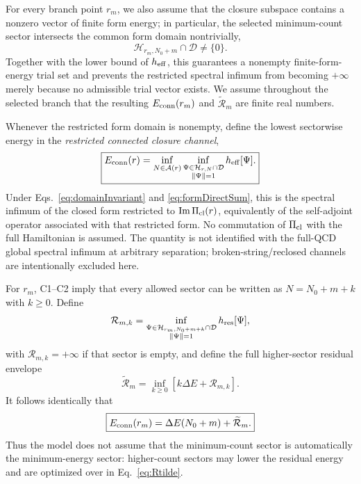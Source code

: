 \documentclass[10pt]{article}
\begin{document}
For every branch point $r_m$, we also assume that the closure subspace contains a nonzero vector of finite form energy; in particular, the selected minimum-count sector intersects the common form domain nontrivially,
\begin{equation}
\boxed{\mathcal H_{r_m,N_0+m}\cap\mathcal D\neq\{0\}.}
\label{eq:nonemptyFormSector}
\end{equation}
Together with the lower bound of $h_{\rm eff}$, this guarantees a nonempty finite-form-energy trial set and prevents the restricted spectral infimum from becoming $+\infty$ merely because no admissible trial vector exists. We assume throughout the selected branch that the resulting $E_{\rm conn}(r_m)$ and $\widetilde{\mathcal R}_m$ are finite real numbers.

Whenever the restricted form domain is nonempty, define the lowest sectorwise energy in the \emph{restricted connected closure channel},
\begin{equation}
\boxed{
E_{\rm conn}(r)=
\inf_{N\in\mathcal A(r)}
\inf_{\substack{\Psi\in\mathcal H_{r,N}\cap\mathcal D\\
\|\Psi\|=1}}
h_{\rm eff}[\Psi].
}
\label{eq:EconnDef}
\end{equation}
Under Eqs.~\eqref{eq:domainInvariant} and \eqref{eq:formDirectSum}, this is the spectral infimum of the closed form restricted to $\operatorname{Im}\Pi_{\rm cl}(r)$, equivalently of the self-adjoint operator associated with that restricted form. No commutation of $\Pi_{\rm cl}$ with the full Hamiltonian is assumed. The quantity is not identified with the full-QCD global spectral infimum at arbitrary separation; broken-string/reclosed channels are intentionally excluded here.

For $r_m$, C1--C2 imply that every allowed sector can be written as $N=N_0+m+k$ with $k\ge0$. Define
\begin{equation}
\mathcal R_{m,k}=
\inf_{\substack{\Psi\in\mathcal H_{r_m,N_0+m+k}\cap\mathcal D\\
\|\Psi\|=1}}
h_{\rm res}[\Psi],
\label{eq:Rmk}
\end{equation}
with $\mathcal R_{m,k}=+\infty$ if that sector is empty, and define the full higher-sector residual envelope
\begin{equation}
\boxed{
\widetilde{\mathcal R}_m
=\inf_{k\ge0}
\left[k\Delta E+\mathcal R_{m,k}\right].
}
\label{eq:Rtilde}
\end{equation}
It follows identically that
\begin{equation}
\boxed{
E_{\rm conn}(r_m)
=\Delta E(N_0+m)+\widetilde{\mathcal R}_m.
}
\label{eq:EconnEnvelope}
\end{equation}
Thus the model does not assume that the minimum-count sector is automatically the minimum-energy sector: higher-count sectors may lower the residual energy and are optimized over in Eq.~\eqref{eq:Rtilde}.
\end{document}
